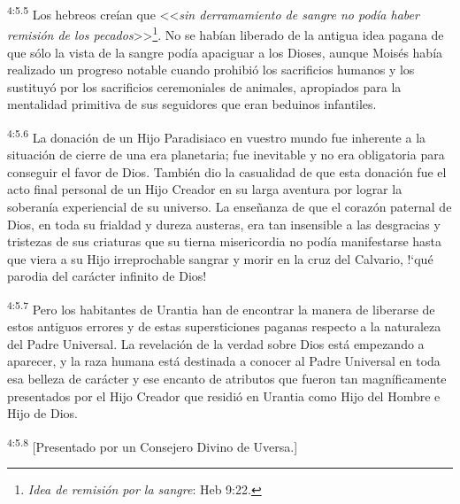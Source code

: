 \par
\textsuperscript{4:5.5} Los hebreos creían que <<\textit{sin derramamiento de sangre no podía haber remisión de los pecados}>>\footnote{\textit{Idea de remisión por la sangre}: Heb 9:22.}. No se habían liberado de la antigua idea pagana de que sólo la vista de la sangre podía apaciguar a los Dioses, aunque Moisés había realizado un progreso notable cuando prohibió los sacrificios humanos y los sustituyó por los sacrificios ceremoniales de animales, apropiados para la mentalidad primitiva de sus seguidores que eran beduinos infantiles.

\par
\textsuperscript{4:5.6} La donación de un Hijo Paradisiaco en vuestro mundo fue inherente a la situación de cierre de una era planetaria; fue inevitable y no era obligatoria para conseguir el favor de Dios. También dio la casualidad de que esta donación fue el acto final personal de un Hijo Creador en su larga aventura por lograr la soberanía experiencial de su universo. La enseñanza de que el corazón paternal de Dios, en toda su frialdad y dureza austeras, era tan insensible a las desgracias y tristezas de sus criaturas que su tierna misericordia no podía manifestarse hasta que viera a su Hijo irreprochable sangrar y morir en la cruz del Calvario, !`qué parodia del carácter infinito de Dios!

\par
\textsuperscript{4:5.7} Pero los habitantes de Urantia han de encontrar la manera de liberarse de estos antiguos errores y de estas supersticiones paganas respecto a la naturaleza del Padre Universal. La revelación de la verdad sobre Dios está empezando a aparecer, y la raza humana está destinada a conocer al Padre Universal en toda esa belleza de carácter y ese encanto de atributos que fueron tan magníficamente presentados por el Hijo Creador que residió en Urantia como Hijo del Hombre e Hijo de Dios.

\par
\textsuperscript{4:5.8} [Presentado por un Consejero Divino de Uversa.]
